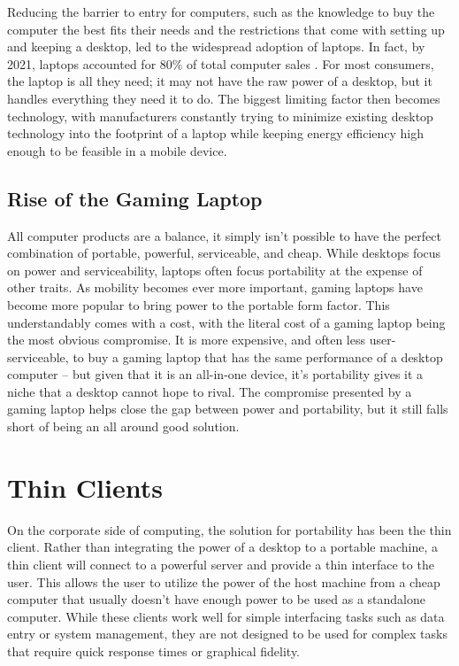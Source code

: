 Reducing the barrier to entry for computers, such as the knowledge to buy the computer the best fits their needs and the restrictions that come with setting up and keeping a desktop, led to the widespread adoption of laptops.
In fact, by 2021, laptops accounted for 80\% of total computer sales \cite{idc_2021}.
For most consumers, the laptop is all they need; it may not have the raw power of a desktop, but it handles everything they need it to do.
The biggest limiting factor then becomes technology, with manufacturers constantly trying to minimize existing desktop technology into the footprint of a laptop while keeping energy efficiency high enough to be feasible in a mobile device.


\subsection{Rise of the Gaming Laptop}\label{RiseOfTheGamingLaptop}

All computer products are a balance, it simply isn't possible to have the perfect combination of portable, powerful, serviceable, and cheap.
While desktops focus on power and serviceability, laptops often focus portability at the expense of other traits.
As mobility becomes ever more important, gaming laptops have become more popular to bring power to the portable form factor.
This understandably comes with a cost, with the literal cost of a gaming laptop being the most obvious compromise.
It is more expensive, and often less user-serviceable, to buy a gaming laptop that has the same performance of a desktop computer -- but given that it is an all-in-one device, it's portability gives it a niche that a desktop cannot hope to rival.
The compromise presented by a gaming laptop helps close the gap between power and portability, but it still falls short of being an all around good solution.


\section{Thin Clients}\label{ThinClients}

On the corporate side of computing, the solution for portability has been the thin client.
Rather than integrating the power of a desktop to a portable machine, a thin client will connect to a powerful server and provide a thin interface to the user.
This allows the user to utilize the power of the host machine from a cheap computer that usually doesn't have enough power to be used as a standalone computer.
While these clients work well for simple interfacing tasks such as data entry or system management, they are not designed to be used for complex tasks that require quick response times or graphical fidelity.


